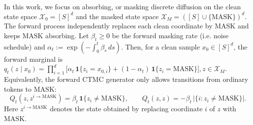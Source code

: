 \documentclass{article}
\begin{document}
In this work, we focus on absorbing, or masking discrete diffusion on the clean state space
\(\mathcal X_0=[S]^d\) and the masked state space
\(\mathcal X_M=([S]\cup\{\mathrm{MASK}\})^d\).  The forward process independently replaces each clean coordinate by \(\mathrm{MASK}\) and keeps \(\mathrm{MASK}\) absorbing.  Let \(\beta_t\ge0\) be the forward masking rate (i.e. noise schedule) and
$\alpha_t
    :=
    \exp\!\left(-\int_0^t \beta_s\,ds\right)$.
Then, for a clean sample \(x_0\in[S]^d\), the forward marginal is $q_t(z\mid x_0)
    =
    \prod\nolimits_{i=1}^d
    \Big[
    \alpha_t\,\mathbf 1\{z_i=x_{0,i}\}
    +
    (1-\alpha_t)\,\mathbf 1\{z_i=\mathrm{MASK}\}
    \Big], z\in\mathcal X_M .$
Equivalently, the forward CTMC generator only allows transitions from ordinary tokens to \(\mathrm{MASK}\):
\[
    Q_t(z,z^{i\to \mathrm{MASK}})
    =
    \beta_t\,\mathbf 1\{z_i\neq \mathrm{MASK}\},
    \qquad
    Q_t(z,z)
    =
    -\beta_t\,|\{i:z_i\neq \mathrm{MASK}\}|.
\]
Here \(z^{i\to \mathrm{MASK}}\) denotes the state obtained by replacing coordinate \(i\) of \(z\) with \(\mathrm{MASK}\).
\end{document}

